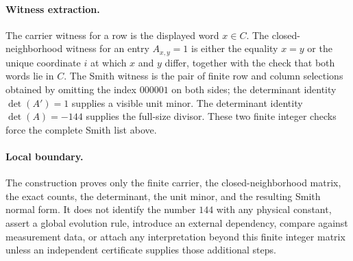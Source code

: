 \paragraph{Witness extraction.} The carrier witness for a row is the displayed word $x\in C$. The closed-neighborhood witness for an entry $A_{x,y}=1$ is either the equality $x=y$ or the unique coordinate $i$ at which $x$ and $y$ differ, together with the check that both words lie in $C$. The Smith witness is the pair of finite row and column selections obtained by omitting the index $000001$ on both sides; the determinant identity $\det(A')=1$ supplies a visible unit minor. The determinant identity $\det(A)=-144$ supplies the full-size divisor. These two finite integer checks force the complete Smith list above.

\paragraph{Local boundary.} The construction proves only the finite carrier, the closed-neighborhood matrix, the exact counts, the determinant, the unit minor, and the resulting Smith normal form. It does not identify the number $144$ with any physical constant, assert a global evolution rule, introduce an external dependency, compare against measurement data, or attach any interpretation beyond this finite integer matrix unless an independent certificate supplies those additional steps.